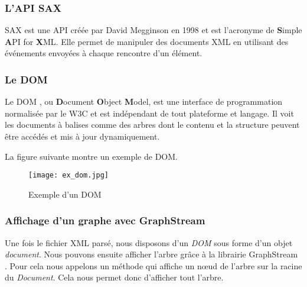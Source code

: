 \subsubsection{L'API SAX}

SAX \cite{sax_website, sax_oracle} est une API créée par David Megginson en 1998 et est l'acronyme de \textbf{S}imple \textbf{A}PI for \textbf{X}ML. Elle permet de manipuler des documents XML en utilisant des événements envoyées à chaque rencontre d'un élément.


\subsubsection{Le DOM}

Le DOM \cite{dom_w3c} , ou \textbf{D}ocument \textbf{O}bject \textbf{M}odel, est une interface de programmation normalisée par le W3C et est indépendant de tout plateforme et langage. Il voit les documents à balises comme des arbres dont le contenu et la structure peuvent être accédés et mis à jour dynamiquement.

\par
La figure suivante montre un exemple de DOM.

\begin{figure}[!h]
\centering
\texttt{[image: ex\_dom.jpg]}\\[1cm]
\caption{Exemple d'un DOM}
\label{Exemple d'un DOM}
\end{figure}


\subsubsection{Affichage d'un graphe avec GraphStream}

Une fois le fichier XML parsé, nous disposons d'un \emph{DOM} sous forme d'un objet \emph{document}. Nous pouvons ensuite afficher l'arbre grâce à la librairie GraphStream \cite{graphstream}. Pour cela nous appelons un méthode qui affiche un nœud de l'arbre sur la racine du \emph{Document}. Cela nous permet donc d'afficher tout l'arbre.
